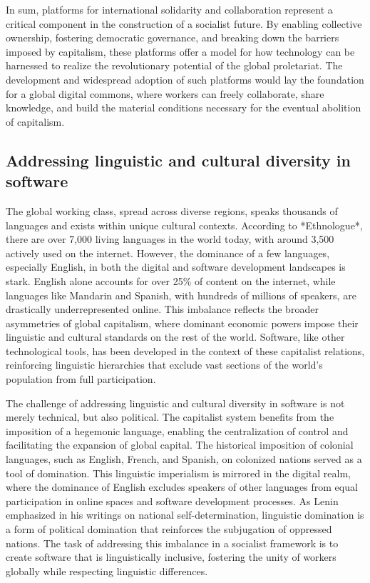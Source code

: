 \begin{refsection}
In sum, platforms for international solidarity and collaboration represent a critical component in the construction of a socialist future. By enabling collective ownership, fostering democratic governance, and breaking down the barriers imposed by capitalism, these platforms offer a model for how technology can be harnessed to realize the revolutionary potential of the global proletariat. The development and widespread adoption of such platforms would lay the foundation for a global digital commons, where workers can freely collaborate, share knowledge, and build the material conditions necessary for the eventual abolition of capitalism.

\cite[pp.~45-52]{marx_international} \cite[pp.~13-20]{hardt_negri_empire} \cite[pp.~77-83]{benkler_commons}

\subsection{Addressing linguistic and cultural diversity in software}

The global working class, spread across diverse regions, speaks thousands of languages and exists within unique cultural contexts. According to *Ethnologue*, there are over 7,000 living languages in the world today, with around 3,500 actively used on the internet. However, the dominance of a few languages, especially English, in both the digital and software development landscapes is stark. English alone accounts for over 25\% of content on the internet, while languages like Mandarin and Spanish, with hundreds of millions of speakers, are drastically underrepresented online. This imbalance reflects the broader asymmetries of global capitalism, where dominant economic powers impose their linguistic and cultural standards on the rest of the world. Software, like other technological tools, has been developed in the context of these capitalist relations, reinforcing linguistic hierarchies that exclude vast sections of the world’s population from full participation.

The challenge of addressing linguistic and cultural diversity in software is not merely technical, but also political. The capitalist system benefits from the imposition of a hegemonic language, enabling the centralization of control and facilitating the expansion of global capital. The historical imposition of colonial languages, such as English, French, and Spanish, on colonized nations served as a tool of domination. This linguistic imperialism is mirrored in the digital realm, where the dominance of English excludes speakers of other languages from equal participation in online spaces and software development processes. As Lenin emphasized in his writings on national self-determination, linguistic domination is a form of political domination that reinforces the subjugation of oppressed nations. The task of addressing this imbalance in a socialist framework is to create software that is linguistically inclusive, fostering the unity of workers globally while respecting linguistic differences.


\end{refsection}
